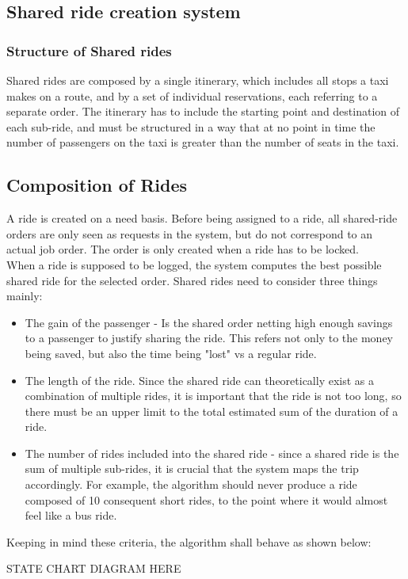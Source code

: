 \newpage
\subsection{Shared ride creation system}
	\subsubsection{Structure of Shared rides}
		Shared rides are composed by a single itinerary, which includes all stops a taxi makes on a route, and by a set of individual reservations, each referring to a separate order.
		The itinerary has to include the starting point and destination of each sub-ride, and must be structured in a way that at no point in time the number of passengers on the taxi is greater than
		the number of seats in the taxi.\\
	\subsection{Composition of Rides}
		A ride is created on a need basis. Before being assigned to a ride, all shared-ride orders are only seen as requests in the system, but do not correspond to an actual job order.
		The order is only created when a ride has to be locked.\\
		When a ride is supposed to be logged, the system computes the best possible shared ride for the selected order. Shared rides need to consider three things mainly:
		\begin{itemize}
		\item The gain of the passenger - Is the shared order netting high enough savings to a passenger to justify sharing the ride. This refers not only to the money being saved, but
		also the time being "lost" vs a regular ride.
		\item The length of the ride. Since the shared ride can theoretically exist as a combination of multiple rides, it is important that the ride is not too long, so there must be an upper limit
		to the total estimated sum of the duration of a ride.
		\item The number of rides included into the shared ride - since a shared ride is the sum of multiple sub-rides, it is crucial that the system maps the trip accordingly. For example, the algorithm
		should never produce a ride composed of 10 consequent short rides, to the point where it would almost feel like a bus ride.
		\end{itemize}
		Keeping in mind these criteria, the algorithm shall behave as shown below:
		
		STATE CHART DIAGRAM HERE
